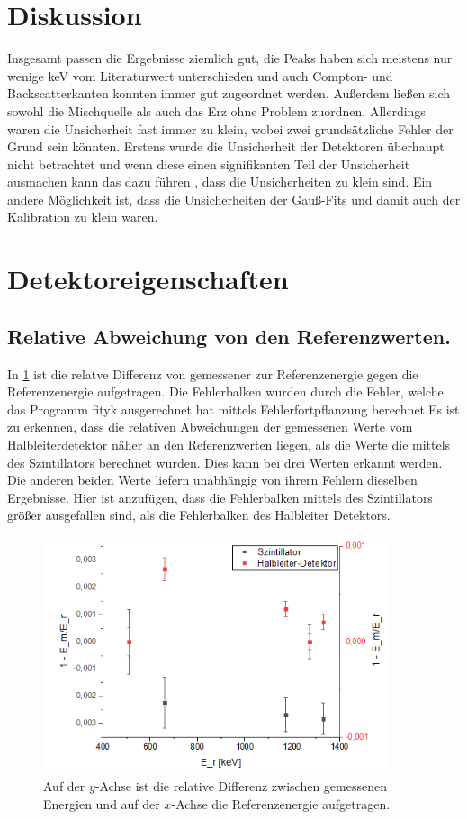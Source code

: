 \section{Diskussion}
Insgesamt passen die Ergebnisse ziemlich gut, die Peaks haben sich meistens nur wenige keV vom Literaturwert unterschieden und auch Compton- und Backscatterkanten konnten immer gut zugeordnet werden. Außerdem ließen sich sowohl die Mischquelle als auch das Erz ohne Problem zuordnen. Allerdings waren die Unsicherheit fast immer zu klein, wobei zwei grundsätzliche Fehler der Grund sein könnten. Erstens wurde die Unsicherheit der Detektoren überhaupt nicht betrachtet und wenn diese einen signifikanten Teil der Unsicherheit ausmachen kann das dazu führen , dass die Unsicherheiten zu klein sind. Ein andere Möglichkeit ist, dass die Unsicherheiten der Gauß-Fits und damit auch der Kalibration zu klein waren.


\section{Detektoreigenschaften}
\subsection{ Relative Abweichung von den Referenzwerten.}
In \cref{ee} ist die relatve Differenz von gemessener zur Referenzenergie gegen die Referenzenergie aufgetragen. Die Fehlerbalken wurden durch die Fehler, welche das Programm fityk ausgerechnet hat mittels Fehlerfortpflanzung berechnet.Es ist zu erkennen, dass die relativen Abweichungen der gemessenen Werte vom Halbleiterdetektor näher an den Referenzwerten liegen, als die Werte die mittels des Szintillators berechnet wurden. Dies kann bei drei Werten erkannt werden. Die anderen beiden Werte liefern unabhängig von ihrern Fehlern dieselben Ergebnisse. Hier ist anzufügen, dass die Fehlerbalken mittels des Szintillators größer ausgefallen sind, als die Fehlerbalken des Halbleiter Detektors.
\begin{figure}[h!]
	\centering
	\includegraphics[width=0.9\textwidth]{1minEdurchE.png}
	\caption{Auf der $y$-Achse ist die relative Differenz zwischen gemessenen Energien und auf der $x$-Achse die Referenzenergie aufgetragen.}
	\label{ee}
\end{figure}
